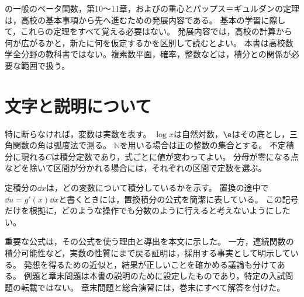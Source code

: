 の一般のベータ関数，第10〜11章，およびの重心とパップス＝ギュルダンの定理は，高校の基本事項から先へ進むための発展内容である。
基本の学習に際して，これらの定理をすべて覚える必要はない。
発展内容では，高校の計算から何が広がるかと，新たに何を仮定するかを区別して読むとよい。
本書は高校数学全分野の教科書ではない。複素数平面，確率，整数などは，積分との関係が必要な範囲で扱う。

\section*{文字と説明について}
特に断らなければ，変数は実数を表す。
$\log x$は自然対数，$\e$はその底とし，三角関数の角は弧度法で測る。
$\mathbb{N}$を用いる場合は正の整数の集合とする。
不定積分に現れる$C$は積分定数であり，式ごとに値が変わってよい。
分母が零になる点などを除いて区間が分かれる場合には，それぞれの区間で定数を選ぶ。

定積分の$\dd x$は，どの変数について積分しているかを示す。
置換の途中で$\dd u=g'(x)\dd x$と書くときには，置換積分の公式を簡潔に表している。
この記号だけを根拠に，どのような操作でも分数のように行えると考えないようにしたい。

重要な公式は，その公式を使う理由と導出を本文に示した。
一方，連続関数の積分可能性など，実数の性質にまで戻る証明は，採用する事実として明示している。
発想を得るための近似と，結果が正しいことを確かめる議論も分けてある。
例題と章末問題は本書の説明のために設定したものであり，特定の入試問題の転載ではない。
章末問題と総合演習には，巻末にすべて解答を付けた。
